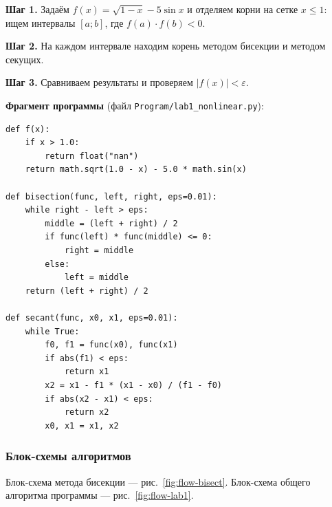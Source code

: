 \documentclass[12pt,a4paper]{scrartcl}
\begin{document}
\textbf{Шаг 1.} Задаём $f(x)=\sqrt{1-x}-5\sin x$ и отделяем корни на сетке $x\le 1$: ищем интервалы $[a;b]$, где $f(a)\cdot f(b)<0$.

\textbf{Шаг 2.} На каждом интервале находим корень методом бисекции и методом секущих.

\textbf{Шаг 3.} Сравниваем результаты и проверяем $|f(x)|<\varepsilon$.

\textbf{Фрагмент программы} (файл \texttt{Program/lab1\_nonlinear.py}):
\begin{verbatim}
def f(x):
    if x > 1.0:
        return float("nan")
    return math.sqrt(1.0 - x) - 5.0 * math.sin(x)

def bisection(func, left, right, eps=0.01):
    while right - left > eps:
        middle = (left + right) / 2
        if func(left) * func(middle) <= 0:
            right = middle
        else:
            left = middle
    return (left + right) / 2

def secant(func, x0, x1, eps=0.01):
    while True:
        f0, f1 = func(x0), func(x1)
        if abs(f1) < eps:
            return x1
        x2 = x1 - f1 * (x1 - x0) / (f1 - f0)
        if abs(x2 - x1) < eps:
            return x2
        x0, x1 = x1, x2
\end{verbatim}

\subsubsection{Блок-схемы алгоритмов}

Блок-схема метода бисекции --- рис.~\ref{fig:flow-bisect}. Блок-схема общего алгоритма программы --- рис.~\ref{fig:flow-lab1}.
\end{document}
